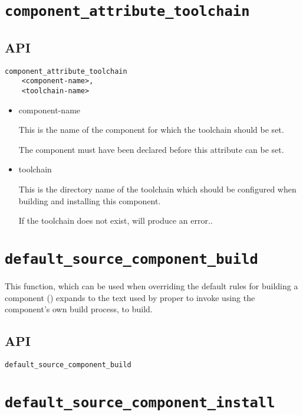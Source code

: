 \section{\texttt{component\_attribute\_toolchain}}\label{api:toolchain}

\subsection{API}

\begin{verbatim}
component_attribute_toolchain
    <component-name>,
    <toolchain-name>
\end{verbatim}

\begin{itemize}
\item component-name

  This is the name of the component for which the toolchain should be
  set.

  The component must have been declared before this attribute can be
  set.

\item toolchain

  This is the directory name of the toolchain which should be
  configured when building and installing this component.

  If the toolchain does not exist, \lmsbw will produce an
  error..

\end{itemize}

\section{\texttt{default\_source\_component\_build}}\label{api:default-source-component-build}

This function, which can be used when overriding the default rules for
building a component () expands to the text used
by \lmsbw proper to invoke \make using the component's own build
process, to build.

\subsection{API}

\begin{verbatim}
default_source_component_build
\end{verbatim}


\section{\texttt{default\_source\_component\_install}}\label{api:default-source-component-install}

